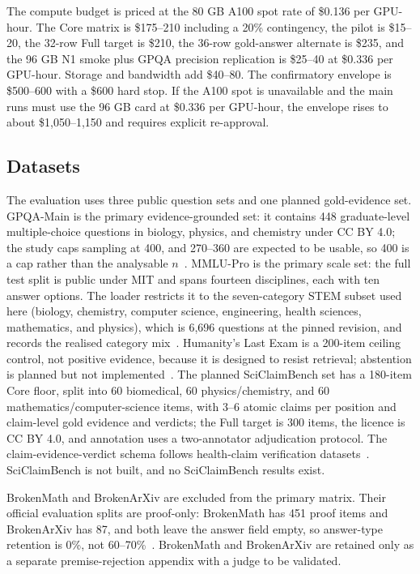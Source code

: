 \documentclass[a4paper,fleqn]{cas-sc}
\begin{document}
The compute budget is priced at the 80 GB A100 spot rate of \$0.136 per GPU-hour. The Core matrix is \$175--210 including a 20\% contingency, the pilot is \$15--20, the 32-row Full target is \$210, the 36-row gold-answer alternate is \$235, and the 96 GB N1 smoke plus GPQA precision replication is \$25--40 at \$0.336 per GPU-hour. Storage and bandwidth add \$40--80. The confirmatory envelope is \$500--600 with a \$600 hard stop. If the A100 spot is unavailable and the main runs must use the 96 GB card at \$0.336 per GPU-hour, the envelope rises to about \$1,050--1,150 and requires explicit re-approval.

\subsection{Datasets}

The evaluation uses three public question sets and one planned gold-evidence set. GPQA-Main is the primary evidence-grounded set: it contains 448 graduate-level multiple-choice questions in biology, physics, and chemistry under CC BY 4.0; the study caps sampling at 400, and 270--360 are expected to be usable, so 400 is a cap rather than the analysable $n$~\cite{rein2024gpqa}. MMLU-Pro is the primary scale set: the full test split is public under MIT and spans fourteen disciplines, each with ten answer options. The loader restricts it to the seven-category STEM subset used here (biology, chemistry, computer science, engineering, health sciences, mathematics, and physics), which is 6,696 questions at the pinned revision, and records the realised category mix~\cite{wang2024mmlupro}. Humanity's Last Exam is a 200-item ceiling control, not positive evidence, because it is designed to resist retrieval; abstention is planned but not implemented~\cite{phan2026hle}. The planned SciClaimBench set has a 180-item Core floor, split into 60 biomedical, 60 physics/chemistry, and 60 mathematics/computer-science items, with 3--6 atomic claims per position and claim-level gold evidence and verdicts; the Full target is 300 items, the licence is CC BY 4.0, and annotation uses a two-annotator adjudication protocol. The claim-evidence-verdict schema follows health-claim verification datasets~\cite{sarrouti2021healthver}. SciClaimBench is not built, and no SciClaimBench results exist.

BrokenMath and BrokenArXiv are excluded from the primary matrix. Their official evaluation splits are proof-only: BrokenMath has 451 proof items and BrokenArXiv has 87, and both leave the answer field empty, so answer-type retention is 0\%, not 60--70\%~\cite{petrov2025brokenmath,dekoninck2026matharena}. BrokenMath and BrokenArXiv are retained only as a separate premise-rejection appendix with a judge to be validated.
\end{document}
